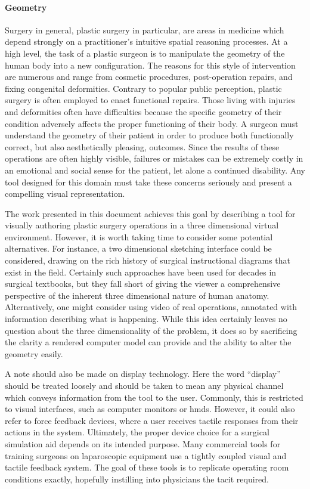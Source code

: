 \paragraph{Geometry} Surgery in general, plastic surgery in
particular, are areas in medicine which depend strongly on a
practitioner's intuitive spatial reasoning processes. At a high level,
the task of a plastic surgeon is to manipulate the geometry of the
human body into a new configuration. The reasons for this style of
intervention are numerous and range from cosmetic procedures,
post-operation repairs, and fixing congenital deformities. Contrary to
popular public perception, plastic surgery is often employed to enact
functional repairs. Those living with injuries and deformities often
have difficulties because the specific geometry of their condition
adversely affects the proper functioning of their body. A surgeon must
understand the geometry of their patient in order to produce both
functionally correct, but also aesthetically pleasing, outcomes. Since
the results of these operations are often highly visible, failures or mistakes can be
extremely costly in an emotional and social sense for the patient, let
alone a continued disability. Any tool designed for this domain must
take these concerns seriously and present a compelling visual
representation.

The work presented in this document achieves this goal by describing a
tool for visually authoring plastic surgery operations in a three
dimensional virtual environment. However, it is worth taking time to consider
some potential alternatives. For instance, a two dimensional sketching
interface could be considered, drawing on the rich history of surgical
instructional diagrams that exist in the field. Certainly such
approaches have been used for decades in surgical textbooks, but they
fall short of giving the viewer a comprehensive perspective of the
inherent three dimensional nature of human anatomy. Alternatively, one
might consider using video of real operations, annotated with
information describing what is happening. While this idea certainly
leaves no question about the three dimensionality of the problem, it
does so by sacrificing the clarity a rendered computer model can
provide and the ability to alter the geometry easily.

A note should also be made on display technology. Here the word
``display'' should be treated loosely and should be taken to mean any
physical channel which conveys information from the tool to the
user. Commonly, this is restricted to visual interfaces, such as
computer monitors or \glspl{hmd}. However, it could also refer to
force feedback devices, where a user receives tactile responses from
their actions in the system. Ultimately, the proper device choice for
a surgical simulation aid depends on its intended purpose. Many commercial
tools for training surgeons on laparoscopic equipment use a tightly
coupled visual and tactile feedback system. The goal of these tools is to
replicate operating room conditions exactly, hopefully instilling into
physicians the \gls{tacit} required.

